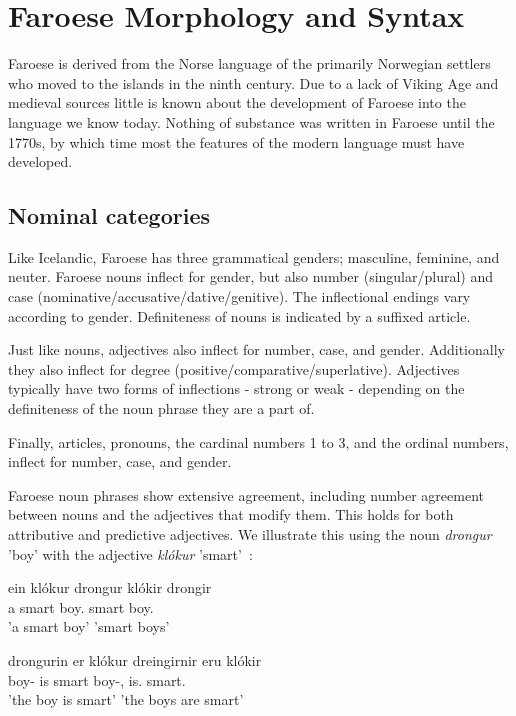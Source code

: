 \documentclass[12pt,%
]{lin-v2/lin}
\let\Oldsubsection\subsection
\renewcommand{\subsection}{\FloatBarrier\Oldsubsection}
\begin{document}
\section{Faroese Morphology and Syntax}

Faroese is derived from the Norse language of the primarily Norwegian settlers
who moved to the islands in the ninth century. Due to a lack of Viking Age
and medieval sources little is known about the development of Faroese into
the language we know today. Nothing of substance was written in Faroese
until the 1770s, by which time most the features of the modern language
must have developed.

\subsection{Nominal categories}

Like Icelandic, Faroese has three grammatical genders; masculine, feminine, and neuter.
Faroese nouns inflect for gender, but also number (singular/plural) and case (nominative/accusative/dative/genitive).
The inflectional endings vary according to gender. Definiteness of nouns is indicated by a suffixed article.

Just like nouns, adjectives also inflect for number, case, and gender. Additionally they also inflect for degree
(positive/comparative/superlative). Adjectives typically have two forms of inflections - strong or weak - depending
on the definiteness of the noun phrase they are a part of.

Finally, articles, pronouns, the cardinal numbers 1 to 3, and the ordinal numbers, inflect for number, case, and gender.

Faroese noun phrases show extensive agreement, including number agreement between nouns and the adjectives that modify them.
This holds for both attributive and predictive adjectives. We illustrate this using the noun \emph{drongur} 'boy'
with the adjective \emph{klókur} 'smart'~\citep[61]{faroese}:
\begin{exe}
    \ex
    \begin{xlist}
    \item \gll ein klókur drongur klókir drongir\\
    a smart boy.\Sg{} smart boy.\Pl{}\\
    \trans 'a smart boy' 'smart boys'
    \item \gll drongurin er klókur dreingirnir eru klókir\\
    boy-\Det{} is smart boy-\Det,\Pl{} is.\Pl{} smart.\Pl\\
    \trans 'the boy is smart' 'the boys are smart'
    \end{xlist}
\end{exe}
\end{document}
